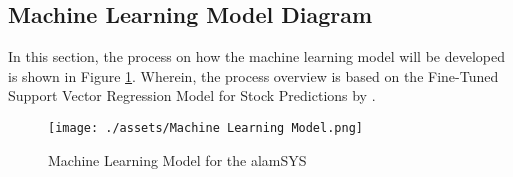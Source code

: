 \subsection{Machine Learning Model Diagram}
\label{subsec:ml_diagram}
In this section, the process on how the machine learning model 
will be developed is shown in Figure \ref{fig:ml_model}. 
Wherein, the process overview is based on the Fine-Tuned Support 
Vector Regression Model for Stock Predictions by 
.
\begin{figure}[ht]
    \centering
    \texttt{[image: ./assets/Machine Learning Model.png]}
    \caption{Machine Learning Model for the alamSYS}
    \label{fig:ml_model}
\end{figure}
\FloatBarrier